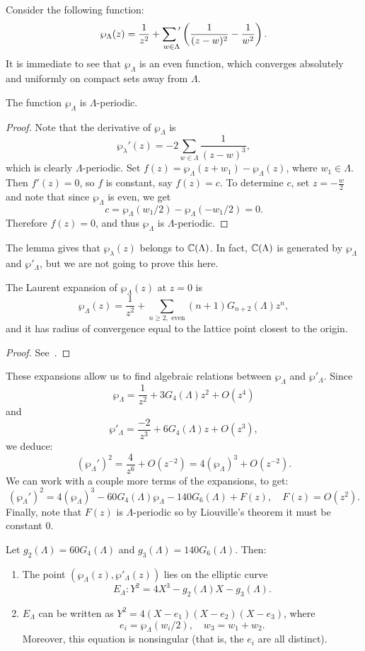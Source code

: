 Consider the following function:
\[
\wp_\Lambda(z)=\frac{1}{z^2}+\sumprime_{w\in\Lambda} \left(\frac{1}{(z-w)^2} - \frac{1}{w^2}\right).
\]
It is immediate to see that $\wp_\Lambda$ is an even function, which converges absolutely and uniformly on compact sets away from $\Lambda$.
\begin{lemma}
  The function $\wp_\Lambda$ is $\Lambda$-periodic.
\end{lemma}
\begin{proof}
  Note that the derivative of $\wp_\Lambda$ is
\[
\wp_\lambda'(z)=-2\sum_{w\in\Lambda} \frac{1}{(z-w)^3},
\]
which is clearly $\Lambda$-periodic. Set $f(z)=\wp_\Lambda(z+w_1)-\wp_\Lambda(z)$, where $w_1\in\Lambda$. Then $f'(z)=0$, so $f$ is constant, say $f(z)=c$. To determine $c$, set $z=-\frac{w}{2}$ and note that since $\wp_\Lambda$ is even, we get
\[
c=\wp_\Lambda(w_1/2)-\wp_\Lambda(-w_1/2) = 0.
\]
Therefore $f(z)=0$, and thus $\wp_\Lambda$ is $\Lambda$-periodic.
\end{proof}

The lemma gives that $\wp_\lambda(z)$ belongs to $\mathbb{C}(\Lambda)$. In fact, $\mathbb{C}(\Lambda)$ is generated by $\wp_\Lambda$ and $\wp'_\Lambda$, but we are not going to prove this here.

\begin{proposition}
  The Laurent expansion of $\wp_\Lambda(z)$ at $z=0$ is
\[
\wp_\Lambda(z) = \frac{1}{z^2} + \sum_{n\geq 2,\text{ even}} (n+1)G_{n+2}(\Lambda)z^{n},
\]
and it has radius of convergence equal to the lattice point closest to the origin.
\end{proposition}
\begin{proof}
  See~\cite[Proposition 1.4.1]{diamond-shurman}.
\end{proof}

These expansions allow us to find algebraic relations between $\wp_\Lambda$ and $\wp'_\Lambda$. Since
\[
\wp_\Lambda = \frac{1}{z^2}+3G_4(\Lambda)z^2+O(z^4)
\]
and
\[
\wp'_\Lambda = \frac{-2}{z^3} + 6G_4(\Lambda)z + O(z^3),
\]
we deduce:
\[
(\wp_\Lambda')^2=\frac{4}{z^6}+O(z^{-2}) = 4(\wp_\Lambda)^3 + O(z^{-2}).
\]
We can work with a couple more terms of the expansions, to get:
\[
(\wp_\Lambda')^2 = 4(\wp_\Lambda)^3-60G_4(\Lambda)\wp_\Lambda-140G_6(\Lambda)+F(z),\quad F(z)=O(z^2).
\]
Finally, note that $F(z)$ is $\Lambda$-periodic so by Liouville's theorem it must be constant $0$.

\begin{proposition}
  Let $g_2(\Lambda) = 60G_4(\Lambda)$ and $g_3(\Lambda)=140G_6(\Lambda)$. Then:
  \begin{enumerate}
  \item The point $(\wp_\Lambda(z),\wp'_\Lambda(z))$ lies on the elliptic curve
\[
E_\Lambda\colon Y^2=4X^3-g_2(\Lambda)X-g_3(\Lambda).
\]
\item $E_\Lambda$ can be written as $Y^2=4(X-e_1)(X-e_2)(X-e_3)$, where
\[
e_i = \wp_\Lambda(w_i/2),\quad w_3 = w_1+w_2.
\]
Moreover, this equation is nonsingular (that is, the $e_i$ are all distinct).
  \end{enumerate}
\end{proposition}

